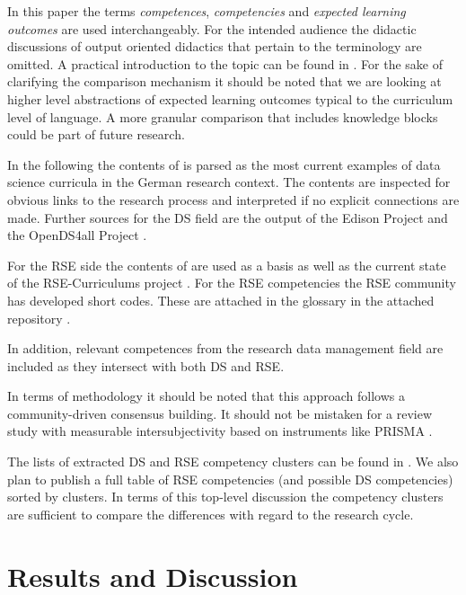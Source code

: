 \documentclass[
        english,biblatex
    ]{lni}
\begin{document}
    In this paper the terms \emph{competences}, \emph{competencies} and
    \emph{expected learning outcomes} are used interchangeably. For the
    intended audience the didactic discussions of output oriented
    didactics that pertain to the terminology are omitted. A practical
    introduction to the topic can be found in \autocite[112]{Dehne2021}.
    For the sake of clarifying the comparison mechanism it should be
    noted that we are looking at higher level abstractions of expected
    learning outcomes typical to the curriculum level of language. A
    more granular comparison that includes knowledge blocks could be
    part of future research.

    In the following the contents of \autocite{GI2021DataScience} is
    parsed as the most current examples of data science curricula in the
    German research context. The contents are inspected for obvious
    links to the research process and interpreted if no explicit
    connections are made. Further sources for the DS field are the
    output of the Edison Project \autocite{EDSF2017} and the OpenDS4all
    Project \autocite{OpenDS4All2020}.

    For the RSE side the contents of \autocite{Goth2024RSE} are used as
    a basis as well as the current state of the RSE-Curriculums project
    \autocite{RSECurriculums2021}. For the RSE competencies the RSE
    community has developed short codes. These are attached in the
    glossary in the attached repository \autocite{ds2rse2025}.

    In addition, relevant competences from the research data management
    field \autocite{petersen_2025_15025246} are included as they
    intersect with both DS and RSE.

    In terms of methodology it should be noted that this approach
    follows a community-driven consensus building. It should not be
    mistaken for a review study with measurable intersubjectivity based
    on instruments like PRISMA \autocite{Page2021PRISMA}.

    The lists of extracted DS and RSE competency clusters can be found
    in \autocite{ds2rse2025}. We also plan to publish a full table of
    RSE competencies (and possible DS competencies) sorted by clusters.
    In terms of this top-level discussion the competency clusters are
    sufficient to compare the differences with regard to the research
    cycle.

    \section{Results and Discussion}\label{results-and-discussion}
\end{document}
